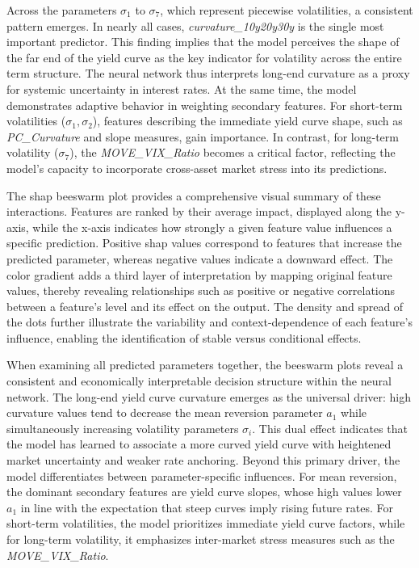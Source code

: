 Across the parameters \(\sigma_1\) to \(\sigma_7\), which represent piecewise volatilities, a consistent pattern emerges. In nearly all cases, \textit{curvature\_10y20y30y} is the single most important predictor. This finding implies that the model perceives the \ac{shap}e of the far end of the yield curve as the key indicator for volatility across the entire term structure. The neural network thus interprets long-end curvature as a proxy for systemic uncertainty in interest rates. At the same time, the model demonstrates adaptive behavior in weighting secondary features. For short-term volatilities (\(\sigma_1, \sigma_2\)), features describing the immediate yield curve \ac{shap}e, such as \textit{PC\_Curvature} and slope measures, gain importance. In contrast, for long-term volatility (\(\sigma_7\)), the \textit{MOVE\_VIX\_Ratio} becomes a critical factor, reflecting the model's capacity to incorporate cross-asset market stress into its predictions.

The \ac{shap} beeswarm plot provides a comprehensive visual summary of these interactions. Features are ranked by their average impact, displayed along the y-axis, while the x-axis indicates how strongly a given feature value influences a specific prediction. Positive \ac{shap} values correspond to features that increase the predicted parameter, whereas negative values indicate a downward effect. The color gradient adds a third layer of interpretation by mapping original feature values, thereby revealing relationships such as positive or negative correlations between a feature's level and its effect on the output. The density and spread of the dots further illustrate the variability and context-dependence of each feature's influence, enabling the identification of stable versus conditional effects.

When examining all predicted parameters together, the beeswarm plots reveal a consistent and economically interpretable decision structure within the neural network. The long-end yield curve curvature emerges as the universal driver: high curvature values tend to decrease the mean reversion parameter \(a_1\) while simultaneously increasing volatility parameters \(\sigma_i\). This dual effect indicates that the model has learned to associate a more curved yield curve with heightened market uncertainty and weaker rate anchoring. Beyond this primary driver, the model differentiates between parameter-specific influences. For mean reversion, the dominant secondary features are yield curve slopes, whose high values lower \(a_1\) in line with the expectation that steep curves imply rising future rates. For short-term volatilities, the model prioritizes immediate yield curve factors, while for long-term volatility, it emphasizes inter-market stress measures such as the \textit{MOVE\_VIX\_Ratio}.

